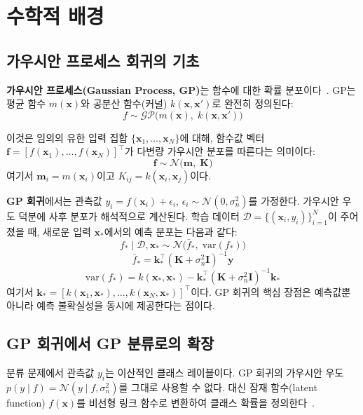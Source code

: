 \documentclass[11pt]{article}
\begin{document}
\section{수학적 배경}

\subsection{가우시안 프로세스 회귀의 기초}

\textbf{가우시안 프로세스(Gaussian Process, GP)}는 함수에 대한 확률 분포이다~\cite{Rasmussen2006}.
GP는 평균 함수 $m(\mathbf{x})$와 공분산 함수(커널) $k(\mathbf{x}, \mathbf{x}')$로 완전히 정의된다:
\[
f \sim \mathcal{GP}\bigl(m(\mathbf{x}),\; k(\mathbf{x}, \mathbf{x}')\bigr)
\]

이것은 임의의 유한 입력 집합 $\{\mathbf{x}_1, \dots, \mathbf{x}_N\}$에 대해,
함수값 벡터 $\mathbf{f} = [f(\mathbf{x}_1), \dots, f(\mathbf{x}_N)]^\top$가 다변량 가우시안 분포를 따른다는 의미이다:
\[
\mathbf{f} \sim \mathcal{N}\bigl(\mathbf{m},\; \mathbf{K}\bigr)
\]
여기서 $\mathbf{m}_i = m(\mathbf{x}_i)$이고 $K_{ij} = k(\mathbf{x}_i, \mathbf{x}_j)$이다.

\textbf{GP 회귀}에서는 관측값 $y_i = f(\mathbf{x}_i) + \epsilon_i$, $\epsilon_i \sim \mathcal{N}(0, \sigma_n^2)$를 가정한다.
가우시안 우도 덕분에 사후 분포가 해석적으로 계산된다.
학습 데이터 $\mathcal{D} = \{(\mathbf{x}_i, y_i)\}_{i=1}^N$이 주어졌을 때,
새로운 입력 $\mathbf{x}_*$에서의 예측 분포는 다음과 같다:
\[
f_* \mid \mathcal{D}, \mathbf{x}_* \sim \mathcal{N}\bigl(\bar{f}_*,\; \mathrm{var}(f_*)\bigr)
\]
\begin{equation}
\bar{f}_* = \mathbf{k}_*^\top (\mathbf{K} + \sigma_n^2 \mathbf{I})^{-1} \mathbf{y}
\label{eq:gp_mean}
\end{equation}
\begin{equation}
\mathrm{var}(f_*) = k(\mathbf{x}_*, \mathbf{x}_*) - \mathbf{k}_*^\top (\mathbf{K} + \sigma_n^2 \mathbf{I})^{-1} \mathbf{k}_*
\label{eq:gp_var}
\end{equation}
여기서 $\mathbf{k}_* = [k(\mathbf{x}_1, \mathbf{x}_*), \dots, k(\mathbf{x}_N, \mathbf{x}_*)]^\top$이다.
GP 회귀의 핵심 장점은 예측값뿐 아니라 예측 불확실성을 동시에 제공한다는 점이다.


\subsection{GP 회귀에서 GP 분류로의 확장}

분류 문제에서 관측값 $y_i$는 이산적인 클래스 레이블이다.
GP 회귀의 가우시안 우도 $p(y \mid f) = \mathcal{N}(y \mid f, \sigma_n^2)$를 그대로 사용할 수 없다.
대신 잠재 함수(latent function) $f(\mathbf{x})$를 비선형 링크 함수로 변환하여 클래스 확률을 정의한다~\cite{Williams1998}.
\end{document}
